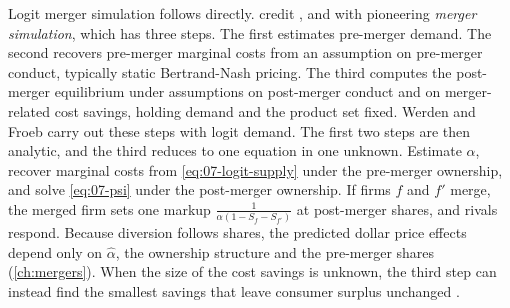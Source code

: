 Logit merger simulation follows directly. \citet[p.~230]{AskerNocke2021} credit \citet{HausmanLeonardZona1994},
\citet{WerdenFroeb1994} and \citet{Nevo2000b} with pioneering \emph{merger simulation}, which has three steps. The
first estimates pre-merger demand. The second recovers pre-merger marginal costs from an assumption on pre-merger
conduct, typically static Bertrand-Nash pricing. The third computes the post-merger equilibrium under assumptions on
post-merger conduct and on merger-related cost savings, holding demand and the product set fixed. Werden and Froeb
carry out these steps with logit demand. The first two steps are then analytic, and the third reduces to one
equation in one unknown.
Estimate $\alpha$, recover marginal
costs from \eqref{eq:07-logit-supply} under the pre-merger ownership, and solve \eqref{eq:07-psi} under the
post-merger ownership. If firms $f$ and $f'$ merge, the merged firm sets one
markup $\frac{1}{\alpha(1 - S_f - S_{f'})}$ at post-merger shares, and rivals respond. Because diversion follows
shares, the predicted dollar price effects depend only on $\hat\alpha$, the ownership structure and the pre-merger
shares (\cref{ch:mergers}). When the size of the cost savings is unknown, the third step can instead find the
smallest savings that leave consumer surplus unchanged \citep[pp.~230--231]{AskerNocke2021}.
